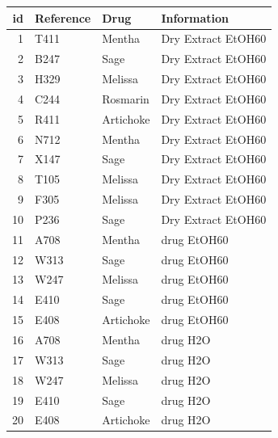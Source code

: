 \documentclass[a4paper]{article}\usepackage[]{graphicx}\usepackage[]{color}
\begin{document}
\begin{longtable}{rlll}
  \hline
id & Reference & Drug & Information \\ 
  \hline
  1 & T411 & Mentha & Dry Extract EtOH60 \\ 
    2 & B247 & Sage & Dry Extract EtOH60 \\ 
    3 & H329 & Melissa & Dry Extract EtOH60 \\ 
    4 & C244 & Rosmarin & Dry Extract EtOH60 \\ 
    5 & R411 & Artichoke & Dry Extract EtOH60 \\ 
    6 & N712 & Mentha & Dry Extract EtOH60 \\ 
    7 & X147 & Sage & Dry Extract EtOH60 \\ 
    8 & T105 & Melissa & Dry Extract EtOH60 \\ 
    9 & F305 & Melissa & Dry Extract EtOH60 \\ 
   10 & P236 & Sage & Dry Extract EtOH60 \\ 
   11 & A708 & Mentha & drug EtOH60 \\ 
   12 & W313 & Sage & drug EtOH60 \\ 
   13 & W247 & Melissa & drug EtOH60 \\ 
   14 & E410 & Sage & drug EtOH60 \\ 
   15 & E408 & Artichoke & drug EtOH60 \\ 
   16 & A708 & Mentha & drug H2O \\ 
   17 & W313 & Sage & drug H2O \\ 
   18 & W247 & Melissa & drug H2O \\ 
   19 & E410 & Sage & drug H2O \\ 
   20 & E408 & Artichoke & drug H2O \\ 
   \hline
\hline
\end{longtable}
\end{document}
